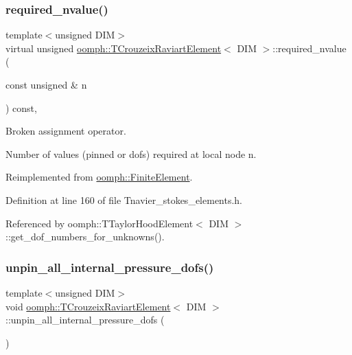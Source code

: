 \mbox{\label{classoomph_1_1TCrouzeixRaviartElement_aec9abe53322bfe995c01fcee24ed95eb}} 
\subsubsection{\texorpdfstring{required\+\_\+nvalue()}{required\_nvalue()}}
{\footnotesize\ttfamily template$<$unsigned D\+IM$>$ \\
virtual unsigned \hyperlink{classoomph_1_1TCrouzeixRaviartElement}{oomph\+::\+T\+Crouzeix\+Raviart\+Element}$<$ D\+IM $>$\+::required\+\_\+nvalue (\begin{DoxyParamCaption}\item[{const unsigned \&}]{n }\end{DoxyParamCaption}) const\hspace{0.3cm}{\ttfamily [inline]}, {\ttfamily [virtual]}}



Broken assignment operator. 

Number of values (pinned or dofs) required at local node n. 

Reimplemented from \hyperlink{classoomph_1_1FiniteElement_a56610c60d5bc2d7c27407a1455471b1a}{oomph\+::\+Finite\+Element}.



Definition at line 160 of file Tnavier\+\_\+stokes\+\_\+elements.\+h.



Referenced by oomph\+::\+T\+Taylor\+Hood\+Element$<$ D\+I\+M $>$\+::get\+\_\+dof\+\_\+numbers\+\_\+for\+\_\+unknowns().

\mbox{\label{classoomph_1_1TCrouzeixRaviartElement_acf0a40b1110f0761c405a92658204f8c}} 
\subsubsection{\texorpdfstring{unpin\+\_\+all\+\_\+internal\+\_\+pressure\+\_\+dofs()}{unpin\_all\_internal\_pressure\_dofs()}}
{\footnotesize\ttfamily template$<$unsigned D\+IM$>$ \\
void \hyperlink{classoomph_1_1TCrouzeixRaviartElement}{oomph\+::\+T\+Crouzeix\+Raviart\+Element}$<$ D\+IM $>$\+::unpin\+\_\+all\+\_\+internal\+\_\+pressure\+\_\+dofs (\begin{DoxyParamCaption}{ }\end{DoxyParamCaption})}



